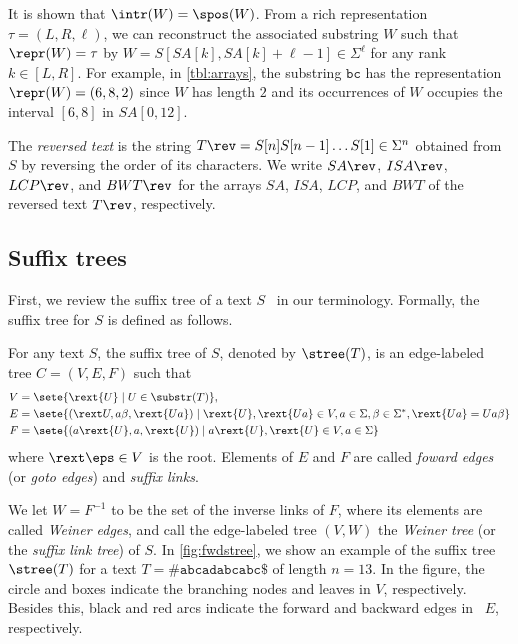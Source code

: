 It is shown that $\intr(W) = \spos(W)$. From a rich representation $\tau = (L, R, \ell)$, we can reconstruct the associated substring $W$ such that $\repr(W) = \tau$ by $W = S[SA[k], SA[k]+\ell-1] \in \Sigma^{\ell}$ for any rank $k \in [L,R]$. 
For example, in \cref{tbl:arrays}, the substring $\mathtt{bc}$ has the representation $\repr(W) = (6,8, 2)$ since $W$ has length $2$ and its occurrences of $W$ occupies the interval $[6,8]$ in $SA[0,12]$. 

The \textit{reversed text} is the string $T\rev = S[n]S[n-1]\dots S[1] \in \Sigma^n$ obtained from $S$ by reversing the order of its characters. 
We write $SA\rev$, $ISA\rev$, $LCP\rev$, and $BWT\rev$ for 
the arrays $SA$, $ISA$, $LCP$, and $BWT$ of the reversed text $T\rev$, respectively.

\subsection{Suffix trees}

First, we review the suffix tree of a text $S$~\cite{gusfield1997algorithms} in our terminology.
Formally, the suffix tree for $S$ is defined as follows. 

\begin{definition}\rm
  \label{def:stree}
  For any text $S$, the suffix tree of $S$, denoted by $\stree(T)$, is an edge-labeled tree $C = (V, E, F)$ such that
  \begin{align*}
    V &= \sete{ \rext{U} \mid U \in \substr(T) },  
    \\
    E &=
    \sete{     (\rext U, a\beta, \rext{Ua})
      \mid \rext{U}, \rext{Ua} \in V, a\in\Sigma, \beta \in \Sigma^*,
      \rext{Ua} = U a\beta 
    }
    \\
    F &=
    \sete{ (a\rext{U}, a, \rext{U})
      \mid a\rext{U}, \rext{U} \in V, a\in\Sigma
    }
  \end{align*}
where $\rext\eps \in V$ is the root. Elements of $E$ and $F$ are called \textit{foward edges} (or \textit{goto edges}) and \textit{suffix links}. 
\end{definition}

We let $W = F^{-1}$ to be the set of the inverse links of $F$, where its elements are called \textit{Weiner edges}, and call the edge-labeled tree $(V, W)$ the \textit{Weiner tree} (or the \textit{suffix link tree}) of $S$. 
In \cref{fig:fwdstree}, we show an example of the suffix tree $\stree(T)$ for a text $T = \mathtt{\#abcadabcabc\$}$ of length $n = 13$. In the figure, the circle and boxes indicate the branching nodes and leaves in $V$, respectively. Besides this, black and red arcs indicate the forward and backward edges in~ $E$, respectively. 


